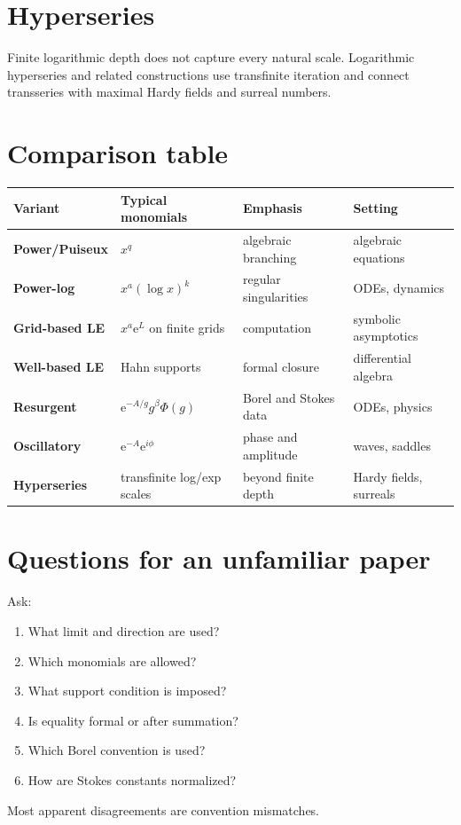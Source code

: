\documentclass[11pt,oneside,openany]{book}
\newcommand{\e}{\mathrm{e}}
\theoremstyle{plain}
\theoremstyle{definition}
\theoremstyle{remark}
\begin{document}
\section{Hyperseries}
Finite logarithmic depth does not capture every natural scale. Logarithmic hyperseries and related constructions use transfinite iteration and connect transseries with maximal Hardy fields and surreal numbers.

\section{Comparison table}
\begin{center}
\small
\begin{tabularx}{0.98\textwidth}{>{\bfseries}p{}p{}Xp{}}
\toprule
Variant & Typical monomials & Emphasis & Setting\\
\midrule
Power/Puiseux & $x^q$ & algebraic branching & algebraic equations\\
Power-log & $x^a(\log x)^k$ & regular singularities & ODEs, dynamics\\
Grid-based LE & $x^a\e^L$ on finite grids & computation & symbolic asymptotics\\
Well-based LE & Hahn supports & formal closure & differential algebra\\
Resurgent & $\e^{-A/g}g^\beta\Phi(g)$ & Borel and Stokes data & ODEs, physics\\
Oscillatory & $\e^{-A}\e^{i\phi}$ & phase and amplitude & waves, saddles\\
Hyperseries & transfinite log/exp scales & beyond finite depth & Hardy fields, surreals\\
\bottomrule
\end{tabularx}
\end{center}

\section{Questions for an unfamiliar paper}
Ask:
\begin{enumerate}
  \item What limit and direction are used?
  \item Which monomials are allowed?
  \item What support condition is imposed?
  \item Is equality formal or after summation?
  \item Which Borel convention is used?
  \item How are Stokes constants normalized?
\end{enumerate}
Most apparent disagreements are convention mismatches.
\end{document}
